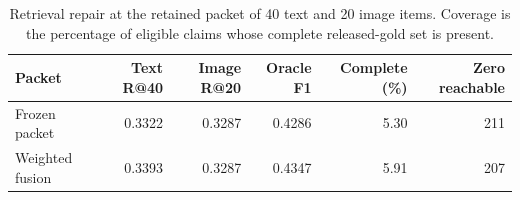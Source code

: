 \begin{table}[t]
\centering
\caption{Retrieval repair at the retained packet of 40 text and 20 image items. Coverage is the percentage of eligible claims whose complete released-gold set is present.}
\label{tab:publication-retrieval}
\small
\begin{tabular}{lrrrrr}
\toprule
Packet & Text R@40 & Image R@20 & Oracle F1 & Complete (\%) & Zero reachable \\
\midrule
Frozen packet & 0.3322 & 0.3287 & 0.4286 & 5.30 & 211 \\
Weighted fusion & 0.3393 & 0.3287 & 0.4347 & 5.91 & 207 \\
\bottomrule
\end{tabular}
\end{table}
